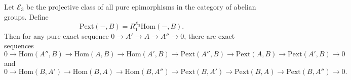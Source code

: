 Let $\mathcal{E}_3$ be the projective class of all pure epimorphisms in the category of abelian groups. Define
$$\text{Pext}(-, B) = R_1^{\mathcal{E}_3} \text{Hom}(-, B).$$
Then for any pure exact sequence $0 \rightarrow A' \rightarrow A \rightarrow A'' \rightarrow 0$, there are exact sequences
$$0 \rightarrow \text{Hom}(A'', B) \rightarrow \text{Hom}(A, B) \rightarrow \text{Hom}(A', B) \rightarrow \text{Pext}(A'', B) \rightarrow \text{Pext}(A, B) \rightarrow \text{Pext}(A', B) \rightarrow 0$$
and
$$0 \rightarrow \text{Hom}(B, A') \rightarrow \text{Hom}(B, A) \rightarrow \text{Hom}(B, A'') \rightarrow \text{Pext}(B, A') \rightarrow \text{Pext}(B, A) \rightarrow \text{Pext}(B, A'') \rightarrow 0.$$
